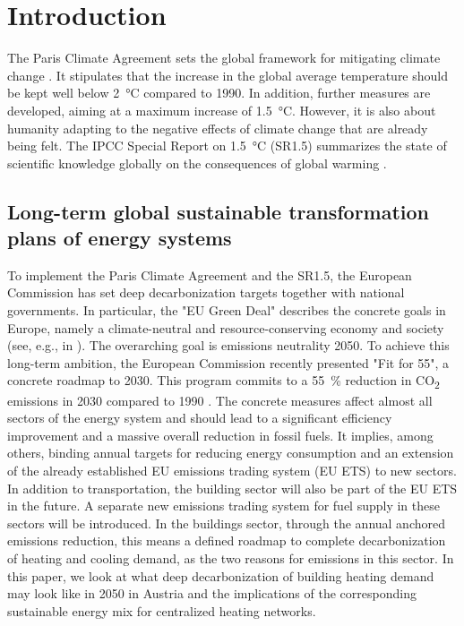 \section{Introduction}
The Paris Climate Agreement sets the global framework for mitigating climate change \cite{agreement2015paris}. It stipulates that the increase in the global average temperature should be kept well below \SI{2}{\degreeCelsius} compared to 1990. In addition, further measures are developed, aiming at a maximum increase of \SI{1.5}{\degreeCelsius}. However, it is also about humanity adapting to the negative effects of climate change that are already being felt. The IPCC Special Report on \SI{1.5}{\degreeCelsius} (SR1.5) summarizes the state of scientific knowledge globally on the consequences of global warming \cite{edenhofer2011ipcc}.

\subsection{Long-term global sustainable transformation plans of energy systems}
To implement the Paris Climate Agreement and the SR1.5, the European Commission has set deep decarbonization targets together with national governments. In particular, the "EU Green Deal" describes the concrete goals in Europe, namely a climate-neutral and resource-conserving economy and society (see, e.g., in \cite{kemfert2019green}). The overarching goal is emissions neutrality 2050. To achieve this long-term ambition, the European Commission recently presented "Fit for 55", a concrete roadmap to 2030. This program commits to a \SI{55}{\%} reduction in CO\textsubscript{2} emissions in 2030 compared to 1990 \cite{european_commission_european_2019}. The concrete measures affect almost all sectors of the energy system and should lead to a significant efficiency improvement and a massive overall reduction in fossil fuels. It implies, among others, binding annual targets for reducing energy consumption and an extension of the already established EU emissions trading system (EU ETS) to new sectors. In addition to transportation, the building sector will also be part of the EU ETS in the future. A separate new emissions trading system for fuel supply in these sectors will be introduced. In the buildings sector, through the annual anchored emissions reduction, this means a defined roadmap to complete decarbonization of heating and cooling demand, as the two reasons for emissions in this sector. In this paper, we look at what deep decarbonization of building heating demand may look like in 2050 in Austria and the implications of the corresponding sustainable energy mix for centralized heating networks.

